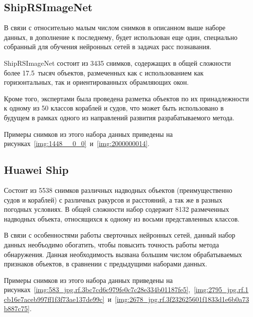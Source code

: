 \subsection*{ShipRSImageNet}

В связи с относительно малым числом снимков в описанном выше наборе данных, в дополнение к последнему, будет использован еще один, специально собранный для обучения нейронных сетей в задачах расс познавания.

ShipRSImageNet состоит из 3435 снимков, содержащих в общей сложности более 17.5~тысяч объектов, размеченных как с использованием как горизонтальных, так и ориентированнызх обрамляющих окон. 

Кроме того, экспертами была проведена разметка объектов по их принадлежности к одному из 50 классов кораблей и судов, что может быть использовано в будущем в рамках одного из направлений развития разрабатываемого метода.

Примеры снимков из этого набора данных приведены на рисунках~\ref{img:1448__0_0}~и~\ref{img:2000000014}.



\subsection*{Huawei Ship}

Состоит из 5538 снимков различных надводных объектов (преимущественно судов и кораблей) с различных ракурсов и расстояний, а так же в разных погодных условиях. В общей сложности набор содержит 8132 размеченных надводных объекта, относящихся к одному из восьми представленных классов. 

В связи с особенностями работы сверточных нейронных сетей, данный набор данных необъодимо обогатить, чтобы повысить точность работы метода обнаружения. Данная необходимость вызвана большим числом обрабатываемых признаков объектов, в сравнении с предыдущими наборами данных.

Примеры снимков из этого набора данных приведены на рисунках~\ref{img:583_jpg.rf.3bc7cd6c979fe0c7c28e334b01187fe5},~\ref{img:2795_jpg.rf.1cb16e7aceb997ff1f3f73ae137de99c}~и~\ref{img:2678_jpg.rf.3f232625601f1833d1e6b0a73b887c75}.


